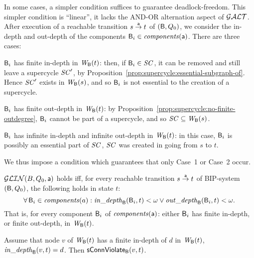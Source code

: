 In some cases, a simpler condition suffices to guarantee deadlock-freedom. This simpler condition is ``linear'', \ie it lacks the AND-OR alternation
aspect of $\GAO$. After execution of a reachable transition $s \la{\act} t$ of $(\B, Q_0)$, 
we consider the in-depth and out-depth of the components $\B_i \in \cmps{\act}$. There are three cases:
%
\bdn

\item[Case 1] \label{case:finite-in}
$\B_i$ has finite in-depth in $\wfg{\B}{t}$: then, if $\B_i \in
\SC$, it can be removed and still leave a supercycle $\SC'$, by
Proposition~\ref{prop:supercycle:essential-subgraph-of}. Hence 
$\SC'$ exists in $\wfg{\B}{s}$, and so 
$\B_i$ is not essential to the creation of a supercycle.

\item[Case 2] \label{case:finite-out}
$\B_i$ has finite out-depth in $\wfg{\B}{t}$: 
by Proposition~\ref{prop:supercycle:no-finite-outdegree}, 
$\B_i$ cannot be part of a supercycle, and so $\SC \sub \wfg{\B}{s}$.

\item[Case 3] \label{case:infinite-both}
$\B_i$ has infinite in-depth and infinite out-depth in
$\wfg{\B}{t}$: in this case, $\B_i$ is possibly an essential part of
$\SC$, \ie $\SC$ was created in going from $s$ to $t$.

\edn
We thus impose a condition which guarantees that only 
Case~1 %
or Case~2 %
occur. 



 \label{def:global:dfc}
$\GLin(B,Q_0,\act)$ holds iff, for every reachable transition $s \goesto[\act] t$ of BIP-system $(\B, Q_0)$, 
the following holds in state $t$:\\
  $$\fa \B_i \in \cmps{a}: \widepth{\B}{\B_i}{t} < \omega \lor \wodepth{\B}{\B_i}{t} < \omega.$$
That is, for every component $\B_i$ of $\cmps{\act}$:  either $\B_i$ has finite in-depth,
or finite out-depth, in $\wfg{\B}{t}$.



\ed



\bp \label{prop:indepth-finite-implies-scViol}
Assume that node $v$ of $\wfg{\B}{t}$ has a finite in-depth of $d$ in $\wfg{\B}{t}$, \ie 
$\widepth{\B}{v}{t} = d$. Then $\connViol{v}{t}$.
\ep
%



